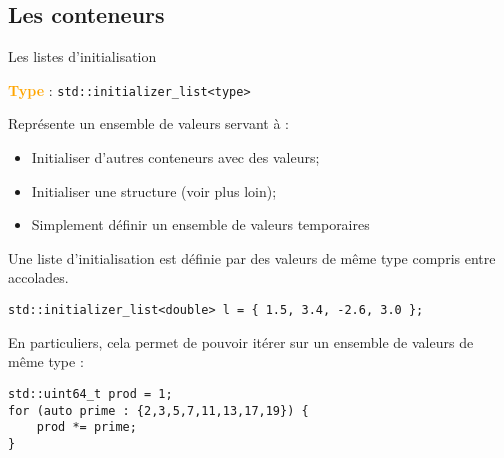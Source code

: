 \documentclass[compress,10pt,aspectratio=169]{beamer}
\begin{document}
\subsection{Les conteneurs}

\begin{frame}[fragile]{Les listes d'initialisation}
\scriptsize

\textcolor{orange}{\textbf{Type}} : \texttt{std::initializer_list<type>}

Représente un ensemble de valeurs servant à :
\begin{itemize}
\item Initialiser d'autres conteneurs avec des valeurs;
\item Initialiser une structure (voir plus loin);
\item Simplement définir un ensemble de valeurs temporaires
\end{itemize}

Une liste d'initialisation est définie par des valeurs de même type compris entre accolades.
\begin{verbatim}
std::initializer_list<double> l = { 1.5, 3.4, -2.6, 3.0 };
\end{verbatim}

En particuliers, cela permet de pouvoir itérer sur un ensemble de valeurs de même type :
\begin{verbatim}
std::uint64_t prod = 1;
for (auto prime : {2,3,5,7,11,13,17,19}) {
    prod *= prime;    
}
\end{verbatim}
\end{frame}
\end{document}
